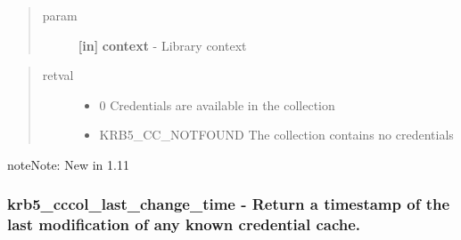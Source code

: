 \documentclass[letterpaper,10pt,english]{sphinxmanual}
\begin{document}
\begin{quote}\begin{description}
\item[{param}] \leavevmode
\textbf{{[}in{]}} \textbf{context} - Library context

\end{description}\end{quote}
\begin{quote}\begin{description}
\item[{retval}] \leavevmode\begin{itemize}
\item {} 
0   Credentials are available in the collection

\item {} 
KRB5\_CC\_NOTFOUND   The collection contains no credentials

\end{itemize}

\end{description}\end{quote}

\begin{notice}{note}{Note:}
New in 1.11
\end{notice}


\subsubsection{krb5\_cccol\_last\_change\_time -  Return a timestamp of the last modification of any known credential cache.}
\label{appdev/refs/api/krb5_cccol_last_change_time:krb5-cccol-last-change-time-return-a-timestamp-of-the-last-modification-of-any-known-credential-cache}\label{appdev/refs/api/krb5_cccol_last_change_time::doc}

\begin{fulllineitems}
\label{appdev/refs/api/krb5_cccol_last_change_time:c.krb5_cccol_last_change_time}
\end{fulllineitems}
\end{document}
